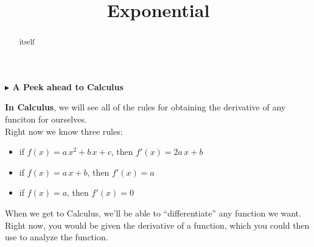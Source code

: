 \documentclass{ximera}
\title{Exponential}
\begin{document}
\begin{abstract}
itself
\end{abstract}
\maketitle





\textbf{\textcolor{red!70!darkgray}{$\blacktriangleright$ A Peek ahead to Calculus}}





\textbf{\textcolor{blue!55!black}{In Calculus}}, we will see all of the rules for obtaining the derivative of any funciton for ourselves. \\

Right now we know three rules:

\begin{itemize}
	\item if $f(x) = a \, x^2 + b \, x + c$, then $f'(x) = 2a \, x + b$
	\item if $f(x) = a \, x + b$, then $f'(x) = a$
	\item if $f(x) = a$, then $f'(x) = 0$
\end{itemize}



When we get to Calculus, we'll be able to ``differentiate'' any function we want. \\

Right now, you would be given the derivative of a function, which you could then use to analyze the function. \\
\end{document}
